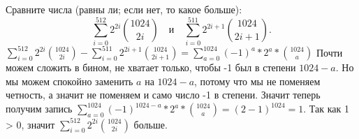 \documentclass[11pt]{article}
\begin{document}
	\p Сравните числа (равны ли; если нет, то какое больше):
	\[
	\sum_{i=0}^{512} 2^{2i}\binom{1024}{2i} \quad\text{и}\quad
	\sum_{i=0}^{511} 2^{2i+1}\binom{1024}{2i+1}.
	\] 
	$\sum_{i=0}^{512} 2^{2i}\binom{1024}{2i} - \sum_{i=0}^{511} 2^{2i+1}\binom{1024}{2i+1} = \sum_{a = 0}^{1024} (-1)^{a} * 2^a * \binom{1024}{a} $
	\sspace
	Почти можем сложить в бином, не хватает только, чтобы -1 был в степени $1024 - a$. Но мы можем спокойно заменить $a$ на $1024 - a$, потому что мы не поменяем четность, а значит не поменяем и само число -1 в степени.
	\sspace
	Значит теперь получим запись  $\sum_{a = 0}^{1024} (-1)^{1024-a} * 2^a * \binom{1024}{a} = (2 - 1)^1024 = 1$. Так как 1 > 0, значит $\sum_{i=0}^{512} 2^{2i}\binom{1024}{2i}$ больше.  
\end{document}
